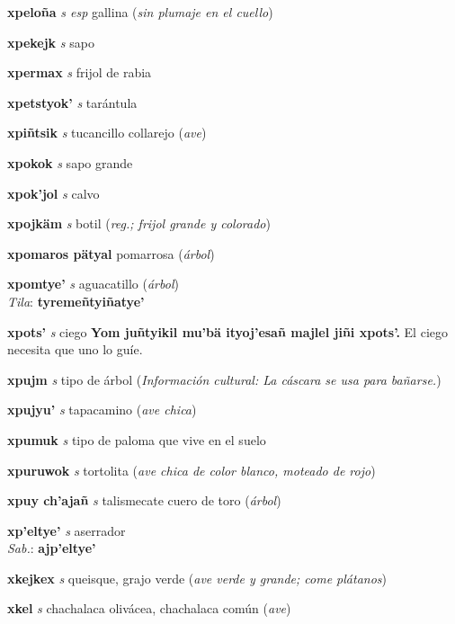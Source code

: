 \documentclass[10pt]{scrbook}
\newcommand{\entry}[1]{\textbf{#1}}
\newcommand{\partofspeech}[1]{\textit{#1}}
\newcommand{\spanishtranslation}[1]{#1}
\newcommand{\clarification}[1]{(\textit{#1})}
\newcommand{\cholexample}[1]{\textbf{#1}}
\newcommand{\exampletranslation}[1]{#1}
\newcommand{\dialectvariant}[1]{\\\textit{#1}:}
\newcommand{\dialectword}[1]{\textbf{#1}}
\newcommand{\culturalinformation}[1]{(\textit{#1})}
\begin{document}
\begin{multicols}{2}
\entry{xpeloña}
\partofspeech{s esp}
\spanishtranslation{gallina}
\clarification{sin plumaje en el cuello}

\entry{xpekejk}
\partofspeech{s}
\spanishtranslation{sapo}

\entry{xpermax}
\partofspeech{s}
\spanishtranslation{frijol de rabia}

\entry{xpetstyok'}
\partofspeech{s}
\spanishtranslation{tarántula}

\entry{xpiñtsik}
\partofspeech{s}
\spanishtranslation{tucancillo collarejo}
\clarification{ave}

\entry{xpokok}
\partofspeech{s}
\spanishtranslation{sapo grande}

\entry{xpok'jol}
\partofspeech{s}
\spanishtranslation{calvo}

\entry{xpojkäm}
\partofspeech{s}
\spanishtranslation{botil}
\clarification{reg.; frijol grande y colorado}

\entry{xpomaros pätyal}
\spanishtranslation{pomarrosa}
\clarification{árbol}

\entry{xpomtye'}
\partofspeech{s}
\spanishtranslation{aguacatillo}
\clarification{árbol}
\dialectvariant{Tila}
\dialectword{tyremeñtyiñatye'}

\entry{xpots'}
\partofspeech{s}
\spanishtranslation{ciego}
\cholexample{Yom juñtyikil mu'bä ityoj'esañ majlel jiñi xpots'.}
\exampletranslation{El ciego necesita que uno lo guíe.}

\entry{xpujm}
\partofspeech{s}
\spanishtranslation{tipo de árbol}
\culturalinformation{Información cultural: La cáscara se usa para bañarse.}

\entry{xpujyu'}
\partofspeech{s}
\spanishtranslation{tapacamino}
\clarification{ave chica}

\entry{xpumuk}
\partofspeech{s}
\spanishtranslation{tipo de paloma que vive en el suelo}

\entry{xpuruwok}
\partofspeech{s}
\spanishtranslation{tortolita}
\clarification{ave chica de color blanco, moteado de rojo}

\entry{xpuy ch'ajañ}
\partofspeech{s}
\spanishtranslation{talismecate}
\spanishtranslation{cuero de toro}
\clarification{árbol}

\entry{xp'eltye'}
\partofspeech{s}
\spanishtranslation{aserrador}
\dialectvariant{Sab.}
\dialectword{ajp'eltye'}

\entry{xkejkex}
\partofspeech{s}
\spanishtranslation{queisque, grajo verde}
\clarification{ave verde y grande; come plátanos}

\entry{xkel}
\partofspeech{s}
\spanishtranslation{chachalaca olivácea, chachalaca común}
\clarification{ave}


\end{multicols}
\end{document}

